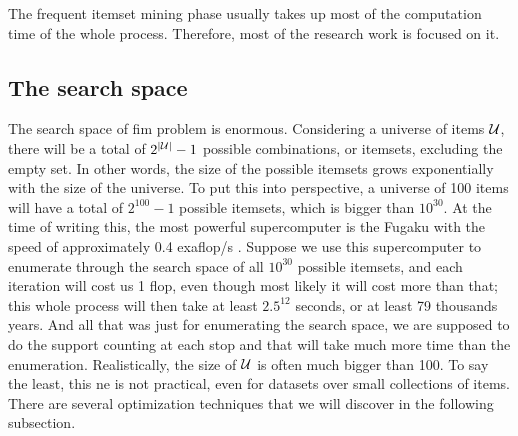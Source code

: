 The frequent itemset mining phase usually takes up most of the computation time of the whole process.
Therefore, most of the research work is focused on it.
\subsection{The search space}
\label{sub:search_space}

The search space of \acl{fim} problem is enormous.
Considering a universe of items $\mathcal{U}$, there will be a total of $2^{\left\lvert \mathcal{U} \right\rvert} - 1$ possible combinations, or itemsets, excluding the empty set.
In other words, the size of the possible itemsets grows exponentially with the size of the universe.
To put this into perspective, a universe of 100 items will have a total of $2^{100} - 1$ possible itemsets, which is bigger than $10^{30}$.
At the time of writing this, the most powerful supercomputer is the Fugaku with the speed of approximately 0.4 exaflop/s \citep{monroe_fugaku_2020}.
Suppose we use this supercomputer to enumerate through the search space of all $10^{30}$ possible itemsets, and each iteration will cost us 1 flop, even though most likely it will cost more than that; this whole process will then take at least $2.5^{12}$ seconds, or at least 79 thousands years.
And all that was just for enumerating the search space, we are supposed to do the support counting at each stop and that will take much more time than the enumeration.
Realistically, the size of $\mathcal{U}$ is often much bigger than 100.
To say the least, this \acl{ne} is not practical, even for datasets over small collections of items.
There are several optimization techniques that we will discover in the following subsection.

